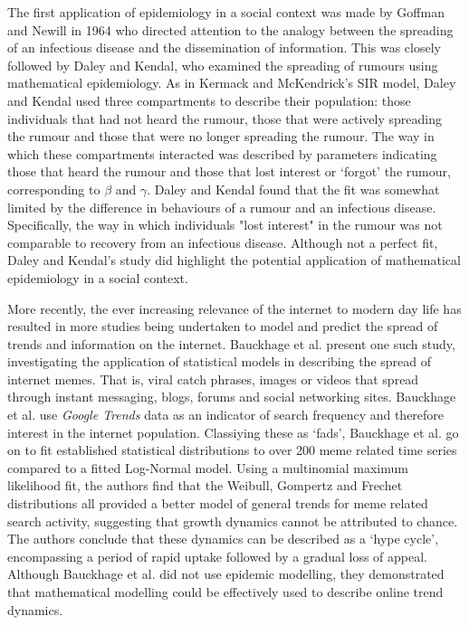\documentclass[11pt, a4paper, oneside,titlepage]{article}
\begin{document}
The first application of epidemiology in a social context was made by Goffman and Newill in 1964 who directed attention to the analogy between the spreading of an infectious disease and the dissemination of information.\cite{goffman} This was closely followed by Daley and Kendal, who examined the spreading of rumours using mathematical epidemiology.\cite{goffman} As in Kermack and McKendrick's SIR model, Daley and Kendal used three compartments to describe their population: those individuals that had not heard the rumour, those that were actively spreading the rumour and those that were no longer spreading the rumour. The way in which these compartments interacted was described by parameters indicating those that heard the rumour and those that lost interest or `forgot' the rumour, corresponding to $\beta$ and $\gamma$. Daley and Kendal found that the fit was somewhat limited by the difference in behaviours of a rumour and an infectious disease. Specifically, the way in which individuals "lost interest"  in the rumour was not comparable to recovery from an infectious disease. Although not a perfect fit, Daley and Kendal's study did highlight the potential application of mathematical epidemiology in a social context.

More recently, the ever increasing relevance of the internet to modern day life has resulted in more studies being undertaken to model and predict the spread of trends and information on the internet. Bauckhage et al. present one such study, investigating the application of statistical models in describing the spread of internet memes.\cite{meme} That is, viral catch phrases, images or videos that spread through instant messaging, blogs, forums and social networking sites. Bauckhage et al. use \emph{Google Trends} data as an indicator of search frequency and therefore interest in the internet population. Classiying these as `fads', Bauckhage et al. go on to fit established statistical distributions to over 200 meme related time series compared to a fitted Log-Normal model. Using a multinomial maximum likelihood fit, the authors find that the Weibull, Gompertz and Frechet distributions all provided a better model of general trends for meme related search activity, suggesting that growth dynamics cannot be attributed to chance. The authors conclude that these dynamics can be described as a `hype cycle', encompassing a period of rapid uptake followed by a gradual loss of appeal. Although Bauckhage et al. did not use epidemic modelling, they demonstrated that mathematical modelling could be effectively used to describe online trend dynamics.
\end{document}
